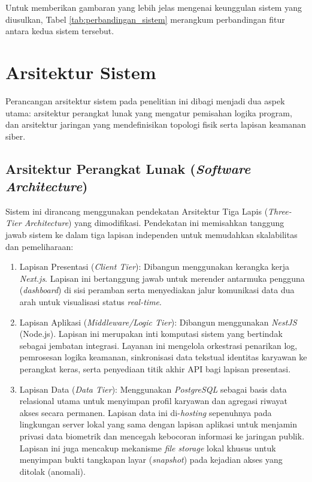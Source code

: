 Untuk memberikan gambaran yang lebih jelas mengenai keunggulan sistem yang diusulkan, Tabel \ref{tab:perbandingan_sistem} merangkum perbandingan fitur antara kedua sistem tersebut.



\section{Arsitektur Sistem}
Perancangan arsitektur sistem pada penelitian ini dibagi menjadi dua aspek utama: arsitektur perangkat lunak yang mengatur pemisahan logika program, dan arsitektur jaringan yang mendefinisikan topologi fisik serta lapisan keamanan siber.

\subsection{Arsitektur Perangkat Lunak (\textit{Software Architecture})}
Sistem ini dirancang menggunakan pendekatan Arsitektur Tiga Lapis (\textit{Three-Tier Architecture}) yang dimodifikasi. Pendekatan ini memisahkan tanggung jawab sistem ke dalam tiga lapisan independen untuk memudahkan skalabilitas dan pemeliharaan:

\begin{enumerate}
    \item Lapisan Presentasi (\textit{Client Tier}): Dibangun menggunakan kerangka kerja \textit{Next.js}. Lapisan ini bertanggung jawab untuk merender antarmuka pengguna (\textit{dashboard}) di sisi peramban serta menyediakan jalur komunikasi data dua arah untuk visualisasi status \textit{real-time}.
    \item Lapisan Aplikasi (\textit{Middleware/Logic Tier}): Dibangun menggunakan \textit{NestJS} (Node.js). Lapisan ini merupakan inti komputasi sistem yang bertindak sebagai jembatan integrasi. Layanan ini mengelola orkestrasi penarikan log, pemrosesan logika keamanan, sinkronisasi data tekstual identitas karyawan ke perangkat keras, serta penyediaan titik akhir API bagi lapisan presentasi.
    \item Lapisan Data (\textit{Data Tier}): Menggunakan \textit{PostgreSQL} sebagai basis data relasional utama untuk menyimpan profil karyawan dan agregasi riwayat akses secara permanen. Lapisan data ini di-\textit{hosting} sepenuhnya pada lingkungan server lokal yang sama dengan lapisan aplikasi untuk menjamin privasi data biometrik dan mencegah kebocoran informasi ke jaringan publik. Lapisan ini juga mencakup mekanisme \textit{file storage} lokal khusus untuk menyimpan bukti tangkapan layar (\textit{snapshot}) pada kejadian akses yang ditolak (anomali).
\end{enumerate}

